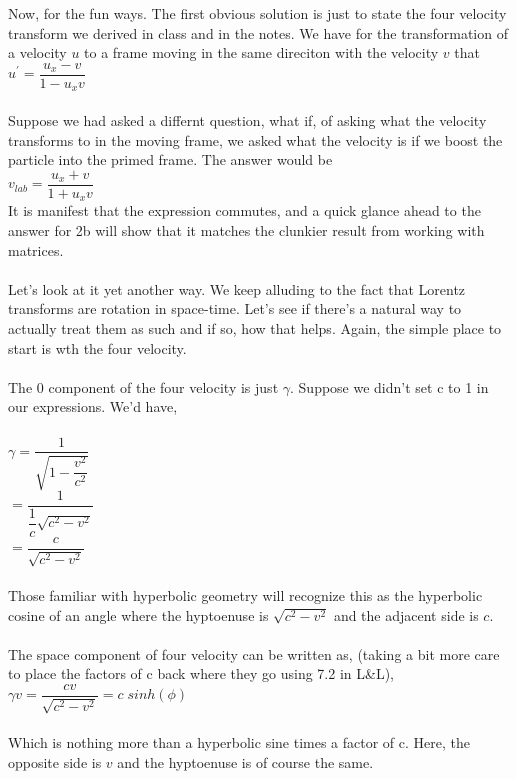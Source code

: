 \documentclass[prb,preprint]
{revtex4-1}
\newcommand{\PRLsep}{\noindent\makebox[\linewidth]{\resizebox{0.8888\linewidth}{2pt}{$\bullet$}}\bigskip}
\begin{document}
\\
\PRLsep
\\
Now, for the fun ways.  The first obvious solution is just to state the four velocity transform we derived in class and in the notes.  We have for the transformation of a velocity $u$ to a frame moving in the same direciton with the velocity $v$ that
\\
$u^\prime = \dfrac{u_x - v}{1-u_x v}$
\\
\\
Suppose we had asked a differnt question, what if, of asking what the velocity transforms to in the moving frame, we asked what the velocity is if we boost the particle into the primed frame.  The answer would be
\\
$v_{lab} = \dfrac{u_x + v}{1+u_x v}$
\\
It is manifest that the expression commutes, and a quick glance ahead to the answer for 2b will show that it matches the clunkier result from working with matrices.
\\
\\
Let's look at it yet another way.  We keep alluding to the fact that Lorentz transforms are rotation in space-time.  Let's see if there's a natural way to actually treat them as such and if so, how that helps.  Again, the  simple place to start is wth the four velocity.
\\
\\
The 0 component of the four velocity is just $\gamma$.  Suppose we didn't set c to 1 in our expressions.  We'd have,
\\
\\
$\gamma = \dfrac{1}{\sqrt{1 - \dfrac{v^2}{c^2}}}$
\\
$= \dfrac{1}{\dfrac{1}{c}\sqrt{c^2 - v^2}}$
\\
$= \dfrac{c}{\sqrt{c^2 - v^2}}$
\\
\\
Those familiar with hyperbolic geometry will recognize this as the hyperbolic cosine of an angle where the hyptoenuse is $\sqrt{c^2 - v^2}$ and the adjacent side is $c$.
\\
\\
The space component of four velocity can be written as, (taking a bit more care to place the factors of c back where they go using 7.2 in L\&L),
\\
$\gamma v = \dfrac{cv}{\sqrt{c^2 - v^2}} = c\;sinh\left(\phi\right)$
\\
\\
Which is nothing more than a hyperbolic sine times a factor of c.  Here, the opposite side is $v$ and the hyptoenuse is of course the same.
\end{document}
